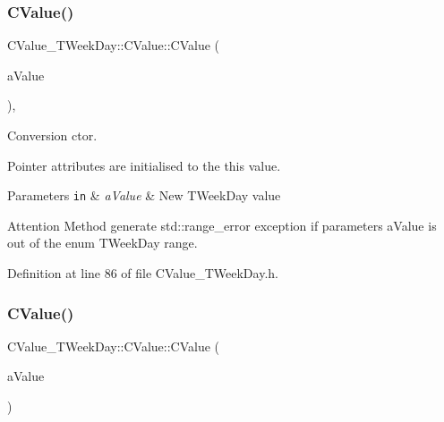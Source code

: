 \subsubsection{\texorpdfstring{C\+Value()}{CValue()}\hspace{0.1cm}{\footnotesize\ttfamily [2/4]}}
{\footnotesize\ttfamily C\+Value\+\_\+\+T\+Week\+Day\+::\+C\+Value\+::\+C\+Value (\begin{DoxyParamCaption}\item[{const enum \hyperlink{namespace_c_value___t_week_day_a6412f204509f223b789fb5f1a61a6124}{T\+Week\+Day}}]{a\+Value }\end{DoxyParamCaption})\hspace{0.3cm}{\ttfamily [inline]}, {\ttfamily [explicit]}}



Conversion c\textquotesingle{}tor. 

Pointer attributes are initialised to the {\ttfamily this} value. 
\begin{DoxyParams}[1]{Parameters}
\mbox{\tt in}  & {\em a\+Value} & New T\+Week\+Day value \\
\hline
\end{DoxyParams}
\begin{DoxyAttention}{Attention}
Method generate {\ttfamily std\+::range\+\_\+error} exception if parameters {\ttfamily a\+Value} is out of the {\ttfamily enum} T\+Week\+Day range. 
\end{DoxyAttention}


Definition at line 86 of file C\+Value\+\_\+\+T\+Week\+Day.\+h.

\mbox{\label{class_c_value___t_week_day_1_1_c_value_a758eb97770180f10addd1c597b13e6d2}} 
\subsubsection{\texorpdfstring{C\+Value()}{CValue()}\hspace{0.1cm}{\footnotesize\ttfamily [3/4]}}
{\footnotesize\ttfamily C\+Value\+\_\+\+T\+Week\+Day\+::\+C\+Value\+::\+C\+Value (\begin{DoxyParamCaption}\item[{const \hyperlink{class_c_value___t_week_day_1_1_c_value}{C\+Value} \&}]{a\+Value }\end{DoxyParamCaption})\hspace{0.3cm}{\ttfamily [inline]}}




